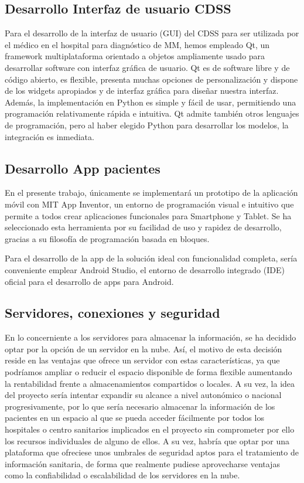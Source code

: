 \documentclass{article}
\begin{document}
\subsection{Desarrollo Interfaz de usuario CDSS}

Para el desarrollo de la interfaz de usuario (GUI) del CDSS para ser
utilizada por el médico en el hospital para diagnóstico de MM, hemos
empleado Qt, un framework multiplataforma orientado a objetos
ampliamente usado para desarrollar software con interfaz gráfica de
usuario. Qt es de software libre y de código abierto, es flexible,
presenta muchas opciones de personalización y dispone de los widgets
apropiados y de interfaz gráfica para diseñar nuestra interfaz.
Además, la implementación en Python es simple y fácil de usar,
permitiendo una programación relativamente rápida e intuitiva. Qt
admite también otros lenguajes de programación, pero al haber elegido
Python para desarrollar los modelos, la integración es inmediata.

\subsection{Desarrollo App pacientes}

En el presente trabajo, únicamente se implementará un prototipo de la
aplicación móvil con MIT App Inventor, un entorno de programación
visual e intuitivo que permite a todos crear aplicaciones funcionales
para Smartphone y Tablet. Se ha seleccionado esta herramienta por su
facilidad de uso y rapidez de desarrollo, gracias a su filosofía de
programación basada en bloques.

Para el desarrollo de la app de la solución ideal con funcionalidad
completa, sería conveniente emplear Android Studio, el entorno de
desarrollo integrado (IDE) oficial para el desarrollo de apps para
Android.

\subsection{Servidores, conexiones y seguridad}

En lo concerniente a los servidores para almacenar la información,  se
ha decidido optar por la opción de un servidor en la  nube.   Así,  el
motivo de esta decisión reside en las ventajas que ofrece un  servidor
con estas características, ya  que  podríamos  ampliar	o  reducir  el
espacio disponible de forma flexible aumentando la rentabilidad frente
a almacenamientos compartidos o  locales.   A  su  vez,  la  idea  del
proyecto sería intentar expandir  su  alcance  a  nivel  autonómico  o
nacional progresivamente, por lo  que  sería  necesario  almacenar  la
información de los pacientes en un espacio al  que  se	pueda  acceder
fácilmente por todos los hospitales o centro sanitarios implicados  en
el proyecto sin comprometer por  ello  los  recursos  individuales  de
alguno de ellos.  A su vez, habría que optar por  una  plataforma  que
ofreciese unos umbrales de seguridad  aptos  para  el  tratamiento  de
información sanitaria, de forma  que  realmente  pudiese  aprovecharse
ventajas como la confiabilidad o escalabilidad de los servidores en la
nube.
\end{document}
